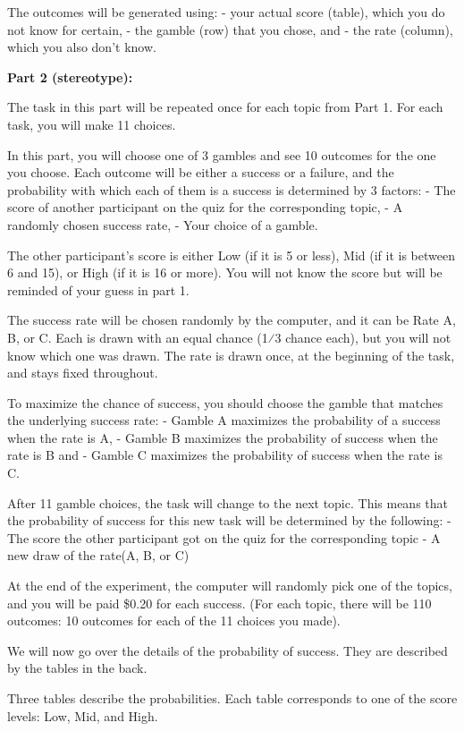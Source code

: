 \documentclass[
  12pt,
]{article}
\begin{document}
The outcomes will be generated using: - your actual score (table), which
you do not know for certain, - the gamble (row) that you chose, and -
the rate (column), which you also don't know.

\textbf{Part 2 (stereotype):}

The task in this part will be repeated once for each topic from Part 1.
For each task, you will make 11 choices.

In this part, you will choose one of 3 gambles and see 10 outcomes for
the one you choose. Each outcome will be either a success or a failure,
and the probability with which each of them is a success is determined
by 3 factors: - The score of another participant on the quiz for the
corresponding topic, - A randomly chosen success rate, - Your choice of
a gamble.

The other participant's score is either Low (if it is 5 or less), Mid
(if it is between 6 and 15), or High (if it is 16 or more). You will not
know the score but will be reminded of your guess in part 1.

The success rate will be chosen randomly by the computer, and it can be
Rate A, B, or C. Each is drawn with an equal chance (1⁄3 chance each),
but you will not know which one was drawn. The rate is drawn once, at
the beginning of the task, and stays fixed throughout.

To maximize the chance of success, you should choose the gamble that
matches the underlying success rate: - Gamble A maximizes the
probability of a success when the rate is A, - Gamble B maximizes the
probability of success when the rate is B and - Gamble C maximizes the
probability of success when the rate is C.

After 11 gamble choices, the task will change to the next topic. This
means that the probability of success for this new task will be
determined by the following: - The score the other participant got on
the quiz for the corresponding topic - A new draw of the rate(A, B, or
C)

At the end of the experiment, the computer will randomly pick one of the
topics, and you will be paid \$0.20 for each success. (For each topic,
there will be 110 outcomes: 10 outcomes for each of the 11 choices you
made).

We will now go over the details of the probability of success. They are
described by the tables in the back.

Three tables describe the probabilities. Each table corresponds to one
of the score levels: Low, Mid, and High.
\end{document}
